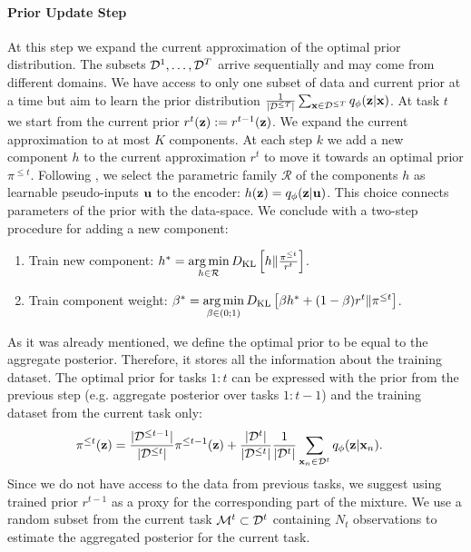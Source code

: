 \paragraph{Prior Update Step} At this step we expand the current approximation of the optimal prior distribution. The subsets $\mathcal{D}^1,\dots, \mathcal{D}^T$ arrive sequentially and may come from different domains. We have access to only one subset of data and current prior at a time but aim to learn the prior distribution $\tfrac{1}{|\mathcal{D}^{\leq T}|}\sum_{{\mathbf{x}}\in\mathcal{D}^{\leq T}}q_{\phi}({\mathbf{z}}|{\mathbf{x}})$. At task $t$ we start from the current prior $r^{t}({\mathbf{z}}):=r^{t-1}({\mathbf{z}})$. We expand the current approximation to at most $K$ components. At each step $k$ we add a new component $h$ to the current approximation $r^{t}$ to move it towards an optimal prior $\pi^{\leq t}$. Following \citep{tomczak2017vae}, we select the parametric family $\mathcal{R}$ of the components $h$ as learnable pseudo-inputs ${\mathbf{u}}$ to the encoder: $h({\mathbf{z}})=q_{\phi}({\mathbf{z}}|{\mathbf{u}})$. This choice connects parameters of the prior with the data-space. We conclude with a two-step procedure for adding a new component:
\begin{enumerate}
	\item Train new component:\newline
	$h^* = \operatorname*{arg\,min}\limits_{h\in\mathcal{R}} D_{\mathrm{KL}}\left[h\|\frac{\pi^{\leq t}}{r^{t}}\right]$.
	\item Train component weight:\newline
	$\beta^* = \operatorname*{arg\,min}\limits_{\beta\in(0;1)} D_{\mathrm{KL}}\left[\beta h^* + (1 - \beta) r^{t} \|\pi^{\leq t}\right]$.
	\end{enumerate}
As it was already mentioned, we define the optimal prior to be equal to the aggregate posterior. Therefore, it stores all the information about the training dataset. The optimal prior for tasks $1:t$ can be expressed with the prior from the previous step (e.g. aggregate posterior over tasks $1:t-1$) and the training dataset from the current task only: 
\begin{equation}
\begin{aligned}
& \pi^{\leq t}({\mathbf{z}}) = \frac{|\mathcal{D}^{\leq t-1}|}{|\mathcal{D}^{\leq t}|} \pi^{\leq t-1}({\mathbf{z}}) + \frac{|\mathcal{D}^{t}|}{|\mathcal{D}^{\leq t}|}\frac{1}{|\mathcal{D}^{t}|}\sum_{{\mathbf{x}}_n\in\mathcal{D}^{t}}q_{\phi}({\mathbf{z}}|{\mathbf{x}}_n).
\end{aligned}
\end{equation}
Since we do not have access to the data from previous tasks, we suggest using trained prior $r^{t-1}$ as a proxy for the corresponding part of the mixture. We use a random subset from the current task $\mathcal{M}^t \subset \mathcal{D}^t$ containing $N_{t}$ observations to estimate the aggregated posterior for the current task.
